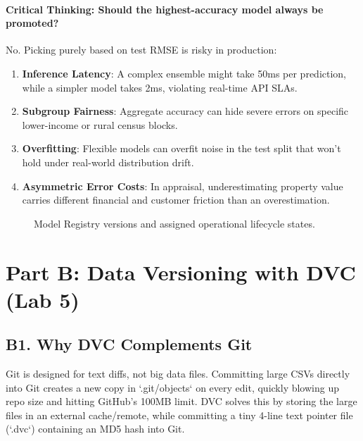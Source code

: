 \documentclass[11pt,a4paper]{article}
\begin{document}
\paragraph{Critical Thinking: Should the highest-accuracy model always be promoted?}
No. Picking purely based on test RMSE is risky in production:
\begin{enumerate}
    \item \textbf{Inference Latency}: A complex ensemble might take 50ms per prediction, while a simpler model takes 2ms, violating real-time API SLAs.
    \item \textbf{Subgroup Fairness}: Aggregate accuracy can hide severe errors on specific lower-income or rural census blocks.
    \item \textbf{Overfitting}: Flexible models can overfit noise in the test split that won't hold under real-world distribution drift.
    \item \textbf{Asymmetric Error Costs}: In appraisal, underestimating property value carries different financial and customer friction than an overestimation.
\end{enumerate}

\begin{figure}[htbp]
\centering
{}
\caption{Model Registry versions and assigned operational lifecycle states.}
\end{figure}

\section{Part B: Data Versioning with DVC (Lab 5)}

\subsection{B1. Why DVC Complements Git}
Git is designed for text diffs, not big data files. Committing large CSVs directly into Git creates a new copy in `.git/objects` on every edit, quickly blowing up repo size and hitting GitHub's 100MB limit. DVC solves this by storing the large files in an external cache/remote, while committing a tiny 4-line text pointer file (`.dvc`) containing an MD5 hash into Git.
\end{document}
